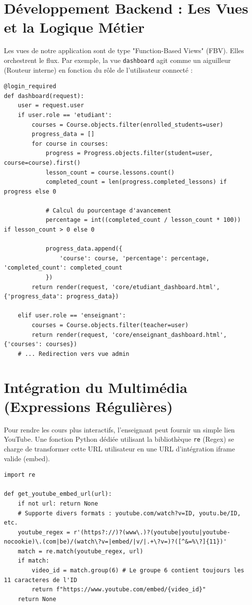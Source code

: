 \documentclass[12pt,a4paper]{report}
\begin{document}
\section{Développement Backend : Les Vues et la Logique Métier}

Les vues de notre application sont de type "Function-Based Views" (FBV). Elles orchestrent le flux. Par exemple, la vue \texttt{dashboard} agit comme un aiguilleur (Routeur interne) en fonction du rôle de l'utilisateur connecté :

\begin{lstlisting}[caption=Logique de routing basée sur les rôles et calcul de progression]
@login_required
def dashboard(request):
    user = request.user
    if user.role == 'etudiant':
        courses = Course.objects.filter(enrolled_students=user)
        progress_data = []
        for course in courses:
            progress = Progress.objects.filter(student=user, course=course).first()
            lesson_count = course.lessons.count()
            completed_count = len(progress.completed_lessons) if progress else 0
            
            # Calcul du pourcentage d'avancement
            percentage = int((completed_count / lesson_count * 100)) if lesson_count > 0 else 0
            
            progress_data.append({
                'course': course, 'percentage': percentage, 'completed_count': completed_count
            })
        return render(request, 'core/etudiant_dashboard.html', {'progress_data': progress_data})
    
    elif user.role == 'enseignant':
        courses = Course.objects.filter(teacher=user)
        return render(request, 'core/enseignant_dashboard.html', {'courses': courses})
    # ... Redirection vers vue admin
\end{lstlisting}

\section{Intégration du Multimédia (Expressions Régulières)}
Pour rendre les cours plus interactifs, l'enseignant peut fournir un simple lien YouTube. Une fonction Python dédiée utilisant la bibliothèque \texttt{re} (Regex) se charge de transformer cette URL utilisateur en une URL d'intégration iframe valide (embed).

\begin{lstlisting}[caption=Extraction de l'ID YouTube par Regex]
import re

def get_youtube_embed_url(url):
    if not url: return None
    # Supporte divers formats : youtube.com/watch?v=ID, youtu.be/ID, etc.
    youtube_regex = r'(https?://)?(www\.)?(youtube|youtu|youtube-nocookie)\.(com|be)/(watch\?v=|embed/|v/|.+\?v=)?([^&=%\?]{11})'
    match = re.match(youtube_regex, url)
    if match:
        video_id = match.group(6) # Le groupe 6 contient toujours les 11 caracteres de l'ID
        return f"https://www.youtube.com/embed/{video_id}"
    return None
\end{lstlisting}
\end{document}
